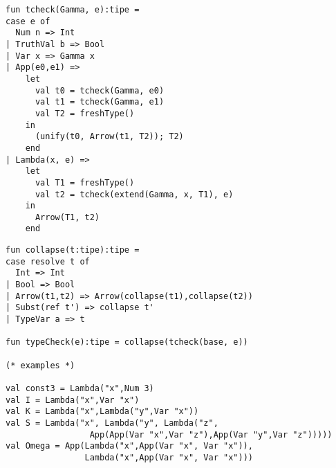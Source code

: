 \documentclass[landscape]{slides}
\begin{document}
\begin{slide}
\color{black}%
\begin{small}
\begin{verbatim}
fun tcheck(Gamma, e):tipe =
case e of
  Num n => Int
| TruthVal b => Bool
| Var x => Gamma x
| App(e0,e1) =>
    let
      val t0 = tcheck(Gamma, e0)
      val t1 = tcheck(Gamma, e1)
      val T2 = freshType()
    in
      (unify(t0, Arrow(t1, T2)); T2)
    end
| Lambda(x, e) =>
    let
      val T1 = freshType()
      val t2 = tcheck(extend(Gamma, x, T1), e)
    in
      Arrow(T1, t2)
    end
\end{verbatim}
\end{small}
\end{slide}

\begin{slide}
\color{black}%
\begin{small}
\begin{verbatim}
fun collapse(t:tipe):tipe =
case resolve t of
  Int => Int
| Bool => Bool
| Arrow(t1,t2) => Arrow(collapse(t1),collapse(t2))
| Subst(ref t') => collapse t'
| TypeVar a => t

fun typeCheck(e):tipe = collapse(tcheck(base, e))

(* examples *)

val const3 = Lambda("x",Num 3)
val I = Lambda("x",Var "x")
val K = Lambda("x",Lambda("y",Var "x"))
val S = Lambda("x", Lambda("y", Lambda("z",
                 App(App(Var "x",Var "z"),App(Var "y",Var "z")))))
val Omega = App(Lambda("x",App(Var "x", Var "x")),
                Lambda("x",App(Var "x", Var "x")))
\end{verbatim}
\end{small}
\end{slide}
\end{document}
